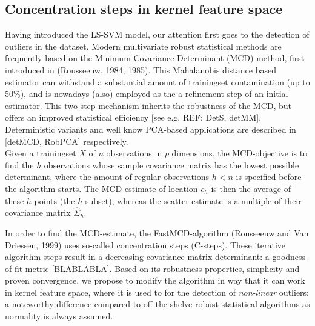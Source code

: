 \documentclass[preprint,12pt]{elsarticle}
\begin{document}
	\subsection{Concentration steps in kernel feature space}
	
	Having introduced the LS-SVM model, our attention first goes to the detection of outliers in the dataset. Modern multivariate robust statistical methods are frequently based on the Minimum Covariance Determinant (MCD) method, first introduced in  (Rousseeuw, 1984, 1985). This Mahalanobis distance based estimator can withstand a substantial amount of trainingset contamination (up to 50\%), and is nowadays (also) employed as the a refinement step of an initial estimator. This two-step mechanism inherits the robustness of the MCD, but offers an improved statistical efficiency [see e.g. REF: DetS, detMM]. Deterministic variants and well know PCA-based applications are described in [detMCD, RobPCA] respectively. \\
	
	Given a trainingset $X$ of $n$ observations in $p$ dimensions, the MCD-objective is to find the $h$ observations whose sample covariance matrix has the lowest possible determinant, where the amount of regular observations $h < n$ is specified before the algorithm starts. The MCD-estimate of location $c_h$ is then the average of these $h$ points (the $h$-subset), whereas the scatter estimate is a multiple of their covariance matrix $\hat{\Sigma}_{h}$. 
	
	In order to find the MCD-estimate, the FastMCD-algorithm (Rousseeuw and Van Driessen, 1999) uses so-called concentration steps (C-steps). These iterative algorithm steps result in a decreasing covariance matrix determinant: a goodness-of-fit metric [BLABLABLA]. Based on its robustness properties, simplicity and proven convergence, we propose to modify the algorithm in way that it can work in kernel feature space, where it is used to for the detection of \textit{non-linear} outliers: a noteworthy difference compared to off-the-shelve robust statistical algorithms as normality is always assumed. \\
	
\end{document}
